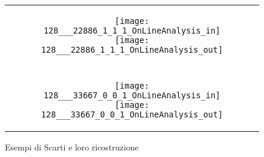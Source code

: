 \begin{figure}[ht] %
  \begin{center}
    \begin{tabular}{c}



      \begin{subfigure}{\linewidth}
        \begin{center}
          \texttt{[image: 128\_\_\_22886\_1\_1\_1\_OnLineAnalysis\_in]}
          \texttt{[image: 128\_\_\_22886\_1\_1\_1\_OnLineAnalysis\_out]}
        \end{center}
      \end{subfigure} \\ \\

      \begin{subfigure}{\linewidth}
        \begin{center}
          \texttt{[image: 128\_\_\_33667\_0\_0\_1\_OnLineAnalysis\_in]}
          \texttt{[image: 128\_\_\_33667\_0\_0\_1\_OnLineAnalysis\_out]}
        \end{center}
      \end{subfigure}

    \end{tabular}
    \caption{Esempi di Scarti e loro ricostruzione}
    \label{fig:scarti_in_out}
  \end{center}
\end{figure}

